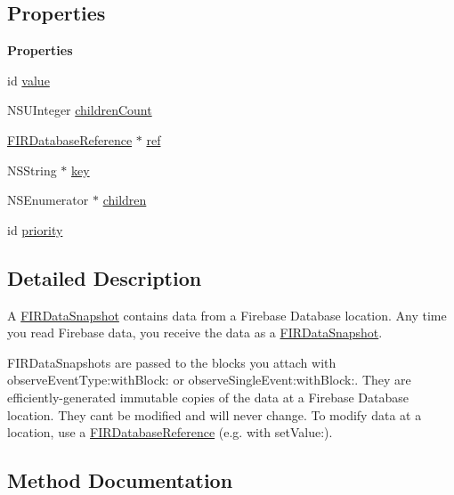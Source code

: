 \subsection*{Properties}
\begin{Indent}{\bf Properties}\par
\begin{DoxyCompactItemize}
\item 
id \hyperlink{interface_f_i_r_data_snapshot_abd618080bd1b6cc92bf842ef685f2917}{value}
\item 
N\+S\+U\+Integer \hyperlink{interface_f_i_r_data_snapshot_a342c472d1faade7a52faa1cc8530c9b4}{children\+Count}
\item 
\hyperlink{interface_f_i_r_database_reference}{F\+I\+R\+Database\+Reference} $\ast$ \hyperlink{interface_f_i_r_data_snapshot_a0b0f3c17189d70f31c62b94d244e761f}{ref}
\item 
N\+S\+String $\ast$ \hyperlink{interface_f_i_r_data_snapshot_a84dcc624075720e171f27b8e9ee8c678}{key}
\item 
N\+S\+Enumerator $\ast$ \hyperlink{interface_f_i_r_data_snapshot_aa141d84d6f0575a3095908a1605daf4d}{children}
\item 
id \hyperlink{interface_f_i_r_data_snapshot_a15147ea53b4b2865f2971ce2f92ff72c}{priority}
\end{DoxyCompactItemize}
\end{Indent}


\subsection{Detailed Description}
A \hyperlink{interface_f_i_r_data_snapshot}{F\+I\+R\+Data\+Snapshot} contains data from a Firebase Database location. Any time you read Firebase data, you receive the data as a \hyperlink{interface_f_i_r_data_snapshot}{F\+I\+R\+Data\+Snapshot}.

F\+I\+R\+Data\+Snapshots are passed to the blocks you attach with observe\+Event\+Type\+:with\+Block\+: or observe\+Single\+Event\+:with\+Block\+:. They are efficiently-\/generated immutable copies of the data at a Firebase Database location. They can\textquotesingle{}t be modified and will never change. To modify data at a location, use a \hyperlink{interface_f_i_r_database_reference}{F\+I\+R\+Database\+Reference} (e.\+g. with set\+Value\+:). 

\subsection{Method Documentation}
\hypertarget{interface_f_i_r_data_snapshot_ad42cd676b4f064b1daa0443d1e049cce}{}
